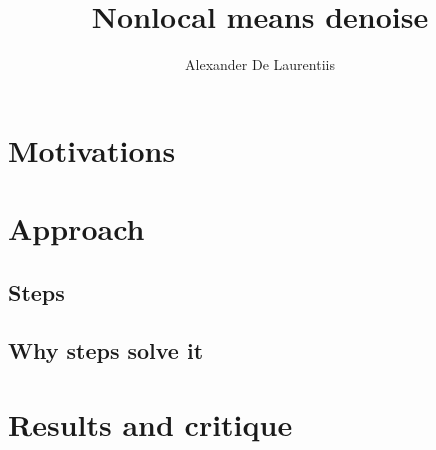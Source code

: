 \documentclass[12pt, letterpaper]{article}
\title{Nonlocal means denoise}
\author{Alexander De Laurentiis}
\begin{document}
\maketitle

\section{Motivations}



\section{Approach}
\subsection{Steps}

\subsection{Why steps solve it}

\section{Results and critique}
\end{document}
